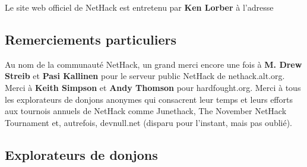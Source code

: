 \documentclass[titlepage]{article}
\begin{document}
Le site web officiel de NetHack est entretenu par \textbf{Ken Lorber}
à l'adresse
\medskip



\subsection{Remerciements particuliers}



Au nom de la communauté NetHack, un grand merci encore une fois à
\textbf{M. Drew Streib} et \textbf{Pasi Kallinen} pour le serveur public NetHack
de nethack.alt.org.
Merci à \textbf{Keith Simpson} et \textbf{Andy Thomson} pour hardfought.org.
Merci à tous les explorateurs de donjons anonymes qui consacrent leur
temps et leurs efforts aux tournois annuels de NetHack comme Junethack, The
November NetHack Tournament et, autrefois, devnull.net (disparu pour
l'instant, mais pas oublié).
\medskip



\subsection{Explorateurs de donjons}
\end{document}
